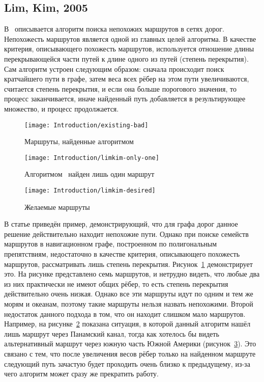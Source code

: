 \FloatBarrier

\subsection{Lim, Kim, 2005}

В~\cite{lim2005shortest} описывается алгоритм поиска непохожих
маршрутов в сетях дорог. Непохожесть маршрутов является одной из
главных целей алгоритма. В качестве критерия, описывающего похожесть
маршрутов, используется отношение длины перекрывающейся части путей к
длине одного из путей (степень перекрытия). Сам алгоритм устроен
следующим образом: сначала происходит поиск кратчайшего пути в графе,
затем веса всех рёбер на этом пути увеличиваются, считается степень
перекрытия, и если она больше порогового значения, то процесс
заканчивается, иначе найденный путь добавляется в результирующее
множество, и процесс продолжается.

\begin{figure}
    \texttt{[image: Introduction/existing-bad]}
    \caption{Маршруты, найденные алгоритмом~\cite{lim2005shortest}}
    \label{fig:limkim1}
\end{figure}

\begin{figure}
    \texttt{[image: Introduction/limkim-only-one]}
    \caption{Алгоритмом~\cite{lim2005shortest} найден лишь один маршрут}
    \label{fig:limkim2}
\end{figure}

\begin{figure}
    \texttt{[image: Introduction/limkim-desired]}
    \caption{Желаемые маршруты}
    \label{fig:limkim3}
\end{figure}

В статье приведён пример, демонстрирующий, что для графа дорог данное
решение действительно находит непохожие пути. Однако при поиске
семейств маршрутов в навигационном графе, построенном по полигональным
препятствиям, недостаточно в качестве критерия, описывающего похожесть
маршрутов, рассматривать лишь степень перекрытия.
Рисунок~\ref{fig:limkim1} демонстрирует это. На рисунке представлено
семь маршрутов, и нетрудно видеть, что любые два из них практически не
имеют общих рёбер, то есть степень перекрытия действительно очень
низкая. Однако все эти маршруты идут по одним и тем же морям и
океанам, поэтому такие маршруты нельзя назвать непохожими. Второй
недостаток данного подхода в том, что он находит слишком мало
маршрутов. Например, на рисунке~\ref{fig:limkim2} показана ситуация, в
которой данный алгоритм нашёл лишь маршрут через Панамский канал,
тогда как хотелось бы видеть альтернативный маршрут через южную часть
Южной Америки (рисунок~\ref{fig:limkim3}). Это связано с тем, что
после увеличения весов рёбер только на найденном маршруте следующий
путь зачастую будет проходить очень близко к предыдущему, из-за чего
алгоритм может сразу же прекратить работу.

